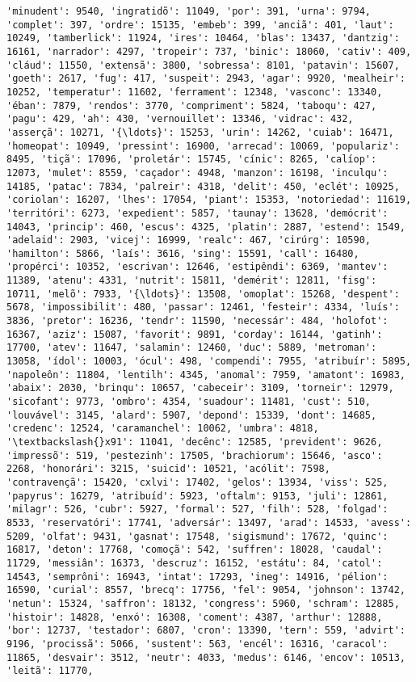 \begin{Verbatim}[commandchars=\\\{\}]
'minudent': 9540, 'ingratidõ': 11049, 'por': 391, 'urna': 9794, 'complet': 397, 'ordre': 15135, 'embeb': 399, 'anciã': 401, 'laut': 10249, 'tamberlick': 11924, 'ires': 10464, 'blas': 13437, 'dantzig': 16161, 'narrador': 4297, 'tropeir': 737, 'binic': 18060, 'cativ': 409, 'cláud': 11550, 'extensã': 3800, 'sobressa': 8101, 'patavin': 15607, 'goeth': 2617, 'fug': 417, 'suspeit': 2943, 'agar': 9920, 'mealheir': 10252, 'temperatur': 11602, 'ferrament': 12348, 'vasconc': 13340, 'éban': 7879, 'rendos': 3770, 'compriment': 5824, 'taboqu': 427, 'pagu': 429, 'ah': 430, 'vernouillet': 13346, 'vidrac': 432, 'asserçã': 10271, '{\ldots}': 15253, 'urin': 14262, 'cuiab': 16471, 'homeopat': 10949, 'pressint': 16900, 'arrecad': 10069, 'populariz': 8495, 'tiçã': 17096, 'proletár': 15745, 'cínic': 8265, 'calíop': 12073, 'mulet': 8559, 'caçador': 4948, 'manzon': 16198, 'inculqu': 14185, 'patac': 7834, 'palreir': 4318, 'delit': 450, 'eclét': 10925, 'coriolan': 16207, 'lhes': 17054, 'piant': 15353, 'notoriedad': 11619, 'territóri': 6273, 'expedient': 5857, 'taunay': 13628, 'demócrit': 14043, 'princip': 460, 'escus': 4325, 'platin': 2887, 'estend': 1549, 'adelaid': 2903, 'vicej': 16999, 'realc': 467, 'cirúrg': 10590, 'hamilton': 5866, 'laís': 3616, 'sing': 15591, 'call': 16480, 'propérci': 10352, 'escrivan': 12646, 'estipêndi': 6369, 'mantev': 11389, 'atenu': 4331, 'nutrit': 15811, 'demérit': 12811, 'fisg': 10711, 'melõ': 7933, '{\ldots}': 13508, 'omoplat': 15268, 'despent': 5678, 'impossibilit': 480, 'passar': 12461, 'festeir': 4334, 'luís': 3836, 'pretor': 16236, 'tendr': 11590, 'necessár': 484, 'holofot': 16367, 'aziz': 15087, 'favorit': 9891, 'corday': 16144, 'gatinh': 17700, 'atev': 11647, 'salamin': 12460, 'duc': 5889, 'metroman': 13058, 'ídol': 10003, 'ócul': 498, 'compendi': 7955, 'atribuír': 5895, 'napoleôn': 11804, 'lentilh': 4345, 'anomal': 7959, 'amatont': 16983, 'abaix': 2030, 'brinqu': 10657, 'cabeceir': 3109, 'torneir': 12979, 'sicofant': 9773, 'ombro': 4354, 'suadour': 11481, 'cust': 510, 'louvável': 3145, 'alard': 5907, 'depond': 15339, 'dont': 14685, 'credenc': 12524, 'caramanchel': 10062, 'umbra': 4818, '\textbackslash{}x91': 11041, 'decênc': 12585, 'prevident': 9626, 'impressõ': 519, 'pestezinh': 17505, 'brachiorum': 15646, 'asco': 2268, 'honorári': 3215, 'suicid': 10521, 'acólit': 7598, 'contravençã': 15420, 'cxlvi': 17402, 'gelos': 13934, 'viss': 525, 'papyrus': 16279, 'atribuíd': 5923, 'oftalm': 9153, 'juli': 12861, 'milagr': 526, 'cubr': 5927, 'formal': 527, 'filh': 528, 'folgad': 8533, 'reservatóri': 17741, 'adversár': 13497, 'arad': 14533, 'avess': 5209, 'olfat': 9431, 'gasnat': 17548, 'sigismund': 17672, 'quinc': 16817, 'deton': 17768, 'comoçã': 542, 'suffren': 18028, 'caudal': 11729, 'messiân': 16373, 'descruz': 16152, 'estátu': 84, 'catol': 14543, 'semprôni': 16943, 'intat': 17293, 'ineg': 14916, 'pélion': 16590, 'curial': 8557, 'brecq': 17756, 'fel': 9054, 'johnson': 13742, 'netun': 15324, 'saffron': 18132, 'congress': 5960, 'schram': 12885, 'histoir': 14828, 'enxó': 16308, 'coment': 4387, 'arthur': 12888, 'bor': 12737, 'testador': 6807, 'cron': 13390, 'tern': 559, 'advirt': 9196, 'procissã': 5066, 'sustent': 563, 'encél': 16316, 'caracol': 11865, 'desvair': 3512, 'neutr': 4033, 'medus': 6146, 'encov': 10513, 'leitã': 11770, 
\end{Verbatim}
